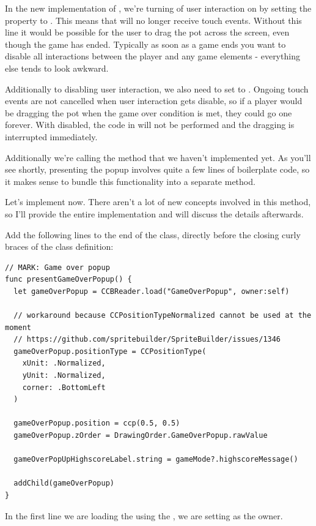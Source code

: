 In the new implementation of , we're turning of user
interaction on  by setting the
 property to . This means
that  will no longer receive touch events. Without this line it
 would be possible for the user to drag the pot across the screen, even though the game has ended. Typically as soon as a
game ends you want to disable all interactions between the player and any game
elements - everything else tends to look awkward.

Additionally to disabling user interaction, we also need to set
 to . Ongoing touch events are not
cancelled when user interaction gets disable, so if a player would be
dragging the pot when the game over condition is met, they could go one forever.
With  disabled, the code in 
will not be performed and the dragging is interrupted immediately.

Additionally we're calling the  method that we
haven't implemented yet. As you'll see shortly, presenting the popup involves
quite a few lines of boilerplate code, so it makes sense to bundle this
functionality into a separate method.

Let's implement  now. There aren't a lot of new
concepts involved in this method, so I'll provide the entire implementation and
will discuss the details afterwards.

\begin{leftbar}
Add the following lines to the end of the  class,
directly before the closing curly braces of the class definition:
\begin{lstlisting}
// MARK: Game over popup
func presentGameOverPopup() {
  let gameOverPopup = CCBReader.load("GameOverPopup", owner:self)
  
  // workaround because CCPositionTypeNormalized cannot be used at the moment
  // https://github.com/spritebuilder/SpriteBuilder/issues/1346
  gameOverPopup.positionType = CCPositionType(
    xUnit: .Normalized,
    yUnit: .Normalized,
    corner: .BottomLeft
  )
  
  gameOverPopup.position = ccp(0.5, 0.5)
  gameOverPopup.zOrder = DrawingOrder.GameOverPopup.rawValue
  
  gameOverPopUpHighscoreLabel.string = gameMode?.highscoreMessage()
  
  addChild(gameOverPopup)
}
\end{lstlisting}
\end{leftbar}
In the first line we are loading the  using the
, we are setting  as the owner.

